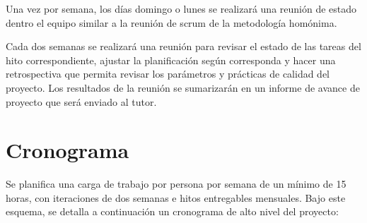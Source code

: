 \documentclass[a4paper,11pt]{article}
\begin{document}
Una vez por semana, los días domingo o lunes se realizará una reunión de estado
dentro el equipo similar a la reunión de scrum \cite{standup} de la
metodología homónima.

Cada dos semanas se realizará una reunión para revisar el estado de las tareas
del hito correspondiente, ajustar la planificación según corresponda y hacer
una retrospectiva \cite{retro} que permita revisar los parámetros y prácticas
de calidad del proyecto. Los resultados de la reunión se sumarizarán en un
informe de avance de proyecto que será enviado al tutor.

\section{Cronograma}

Se planifica una carga de trabajo por persona por semana de un mínimo de 15
horas, con iteraciones de dos semanas e hitos entregables mensuales. Bajo este
esquema, se detalla a continuación un cronograma de alto nivel del proyecto:
\end{document}
